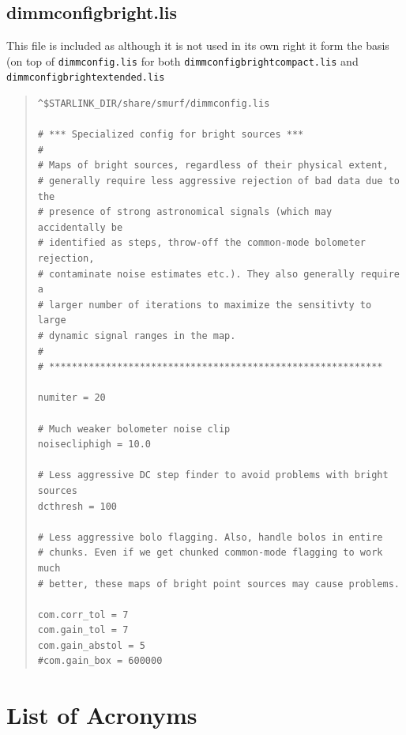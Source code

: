 \documentclass[twoside,11pt]{article}
\newcounter{box}
\newcommand{\xlabel}[1]{}
\renewcommand{\_}{\texttt{\symbol{95}}}
\newenvironment{myquote}{\begin{quote}\begin{small}}{\end{small}\end{quote}}
\begin{document}
\subsection{dimmconfig\_bright.lis}
This file is included as although it is not used in its own right it form the basis (on top of \texttt{dimmconfig.lis} for both \texttt{dimmconfig\_bright\_compact.lis} and \texttt{dimmconfig\_bright\_extended.lis}
\begin{myquote}
\begin{verbatim}
^$STARLINK_DIR/share/smurf/dimmconfig.lis

# *** Specialized config for bright sources ***
#
# Maps of bright sources, regardless of their physical extent,
# generally require less aggressive rejection of bad data due to the
# presence of strong astronomical signals (which may accidentally be
# identified as steps, throw-off the common-mode bolometer rejection,
# contaminate noise estimates etc.). They also generally require a
# larger number of iterations to maximize the sensitivty to large
# dynamic signal ranges in the map.
#
# ***********************************************************

numiter = 20

# Much weaker bolometer noise clip
noisecliphigh = 10.0

# Less aggressive DC step finder to avoid problems with bright sources
dcthresh = 100

# Less aggressive bolo flagging. Also, handle bolos in entire
# chunks. Even if we get chunked common-mode flagging to work much
# better, these maps of bright point sources may cause problems.

com.corr_tol = 7
com.gain_tol = 7
com.gain_abstol = 5
#com.gain_box = 600000
\end{verbatim}
\end{myquote}

\section{\xlabel{acronyms}List of Acronyms}
\end{document}
